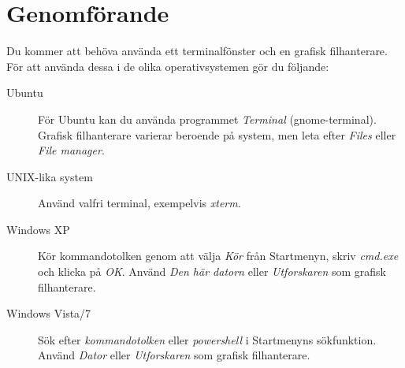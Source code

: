 \documentclass[a4paper]{miunasgn}
\begin{document}
\section{Genomförande}
\label{sec:Genomforande}
\noindent
Du kommer att behöva använda ett terminalfönster och en grafisk filhanterare.
För att använda dessa i de olika operativsystemen gör du följande:
\begin{description}
	\item[Ubuntu] För Ubuntu kan du använda programmet \emph{Terminal} 
		(gnome-terminal).
		Grafisk filhanterare varierar beroende på system, men leta efter 
		\emph{Files} eller \emph{File manager}.
	\item[UNIX-lika system] Använd valfri terminal, exempelvis \emph{xterm}.
	\item[Windows XP] Kör kommandotolken genom att välja \emph{Kör} från
		Startmenyn, skriv \emph{cmd.exe} och klicka på \emph{OK}.
		Använd \emph{Den här datorn} eller \emph{Utforskaren} som grafisk
		filhanterare.
	\item[Windows Vista/7] Sök efter \emph{kommandotolken} eller
		\emph{powershell} i Startmenyns sökfunktion.
		Använd \emph{Dator} eller \emph{Utforskaren} som grafisk filhanterare.
\end{description}
\end{document}
